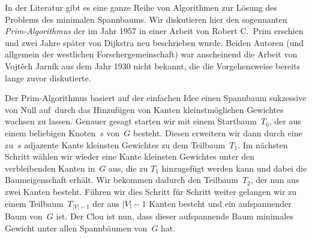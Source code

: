 In der Literatur gibt es eine ganze Reihe von Algorithmen zur Lösung des Problems des minimalen Spannbaums.
Wir diskutieren hier den sogennanten \emph{Prim-Algorithmus} der im Jahr 1957 in einer Arbeit von Robert C.~Prim erschien und zwei Jahre später von Dijkstra neu beschrieben wurde.
Beiden Autoren (und allgemein der westlichen Forschergemeinschaft) war anscheinend die Arbeit von Vojt\v{e}ch Jarn\'{i}k aus dem Jahr 1930 nicht bekannt, die die Vorgehensweise bereits lange zuvor diskutierte.

Der Prim-Algorithmus basiert auf der einfachen Idee einen Spannbaum sukzessive \glqq von Null auf\grqq\ durch das Hinzufügen von Kanten kleinstmöglichen Gewichtes wachsen zu lassen.
Genauer gesagt starten wir mit einem Startbaum~$T_0$, der aus einem beliebigen Knoten~$s$ von~$G$ besteht.
Diesen erweitern wir dann durch eine zu~$s$ adjazente Kante kleinsten Gewichtes zu dem Teilbaum~$T_1$.
Im nächsten Schritt wählen wir wieder eine Kante kleinsten Gewichtes unter den verbleibenden Kanten in~$G$ aus, die zu $T_1$ hinzugefügt werden kann und dabei die Baumeigenschaft erhält.
Wir bekommen dadurch den Teilbaum~$T_2$, der nun aus zwei Kanten besteht.
Führen wir dies Schritt für Schritt weiter gelangen wir zu einem Teilbaum~$T_{|V|-1}$ der aus $|V|-1$ Kanten besteht und ein aufspannender Baum von~$G$ ist.
Der Clou ist nun, dass dieser aufspannende Baum minimales Gewicht unter allen Spannbäumen von~$G$ hat.

